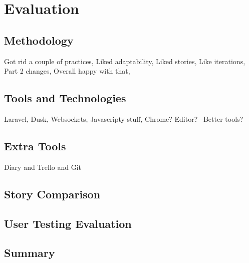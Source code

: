 \chapter{Evaluation}

\section{Methodology}
Got rid a couple of practices,
Liked adaptability,
Liked stories,
Like iterations,
Part 2 changes,
Overall happy with that,
\section{Tools and Technologies}
Laravel, Dusk, Websockets, Javascripty stuff, Chrome? Editor? --Better tools?
\section{Extra Tools}
Diary and Trello and Git
\section{Story Comparison}
\section{User Testing Evaluation}
\section{Summary}